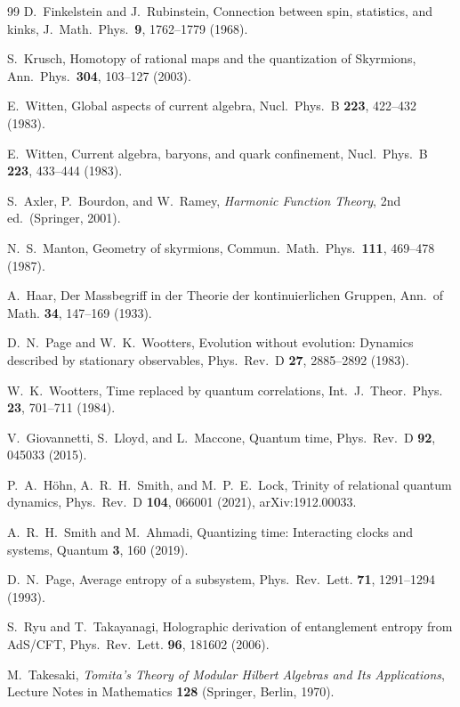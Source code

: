 \documentclass[aps,pra,onecolumn,superscriptaddress,nofootinbib,10pt]{revtex4-2}
\theoremstyle{definition}
\theoremstyle{remark}
\begin{document}
\begin{thebibliography}{99}
 D.~Finkelstein and J.~Rubinstein, Connection between spin, statistics, and kinks, J.\ Math.\ Phys.\ \textbf{9}, 1762--1779 (1968).

 S.~Krusch, Homotopy of rational maps and the quantization of Skyrmions, Ann.\ Phys.\ \textbf{304}, 103--127 (2003).

 E.~Witten, Global aspects of current algebra, Nucl.\ Phys.\ B \textbf{223}, 422--432 (1983).

 E.~Witten, Current algebra, baryons, and quark confinement, Nucl.\ Phys.\ B \textbf{223}, 433--444 (1983).

 S.~Axler, P.~Bourdon, and W.~Ramey, \emph{Harmonic Function Theory}, 2nd ed.\ (Springer, 2001).

 N.~S.~Manton, Geometry of skyrmions, Commun.\ Math.\ Phys.\ \textbf{111}, 469--478 (1987).

 A.~Haar, Der Massbegriff in der Theorie der kontinuierlichen Gruppen, Ann.\ of Math. \textbf{34}, 147--169 (1933).

 D.~N.~Page and W.~K.~Wootters, Evolution without evolution: Dynamics described by stationary observables, Phys.\ Rev.\ D \textbf{27}, 2885--2892 (1983).

 W.~K.~Wootters, Time replaced by quantum correlations, Int.\ J.\ Theor.\ Phys. \textbf{23}, 701--711 (1984).

 V.~Giovannetti, S.~Lloyd, and L.~Maccone, Quantum time, Phys.\ Rev.\ D \textbf{92}, 045033 (2015).

 P.~A.~H\"ohn, A.~R.~H.~Smith, and M.~P.~E.~Lock, Trinity of relational quantum dynamics, Phys.\ Rev.\ D \textbf{104}, 066001 (2021), arXiv:1912.00033.

 A.~R.~H.~Smith and M.~Ahmadi, Quantizing time: Interacting clocks and systems, Quantum \textbf{3}, 160 (2019).

 D.~N.~Page, Average entropy of a subsystem, Phys.\ Rev.\ Lett. \textbf{71}, 1291--1294 (1993).

 S.~Ryu and T.~Takayanagi, Holographic derivation of entanglement entropy from AdS/CFT, Phys.\ Rev.\ Lett. \textbf{96}, 181602 (2006).

 M.~Takesaki, \emph{Tomita's Theory of Modular Hilbert Algebras and Its Applications}, Lecture Notes in Mathematics \textbf{128} (Springer, Berlin, 1970).


\end{thebibliography}
\end{document}
